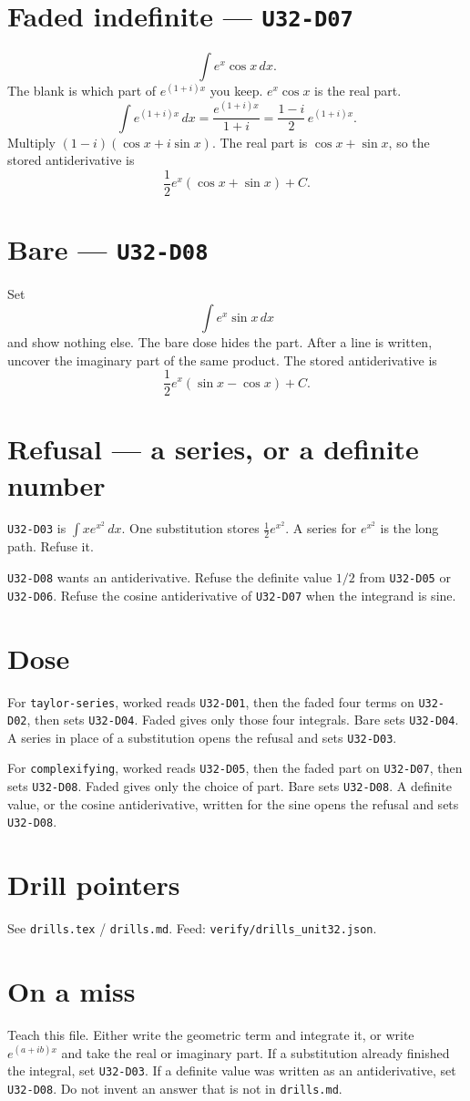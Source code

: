 \section{Faded indefinite --- \texttt{U32-D07}}
\[
\int e^x\cos x\,dx.
\]
The blank is which part of $e^{(1+i)x}$ you keep. $e^x\cos x$ is the real part.
\[
\int e^{(1+i)x}\,dx=\frac{e^{(1+i)x}}{1+i}=\frac{1-i}{2}\,e^{(1+i)x}.
\]
Multiply $(1-i)(\cos x+i\sin x)$. The real part is $\cos x+\sin x$, so the stored antiderivative is
\[
\frac12 e^x(\cos x+\sin x)+C.
\]

\section{Bare --- \texttt{U32-D08}}
Set
\[
\int e^x\sin x\,dx
\]
and show nothing else. The bare dose hides the part. After a line is written, uncover the imaginary part of the same product. The stored antiderivative is
\[
\frac12 e^x(\sin x-\cos x)+C.
\]

\section{Refusal --- a series, or a definite number}
\texttt{U32-D03} is $\int x e^{x^2}\,dx$. One substitution stores $\frac12 e^{x^2}$. A series for $e^{x^2}$ is the long path. Refuse it.

\texttt{U32-D08} wants an antiderivative. Refuse the definite value $1/2$ from \texttt{U32-D05} or \texttt{U32-D06}. Refuse the cosine antiderivative of \texttt{U32-D07} when the integrand is sine.

\section{Dose}
For \texttt{taylor-series}, worked reads \texttt{U32-D01}, then the faded four terms on \texttt{U32-D02}, then sets \texttt{U32-D04}. Faded gives only those four integrals. Bare sets \texttt{U32-D04}. A series in place of a substitution opens the refusal and sets \texttt{U32-D03}.

For \texttt{complexifying}, worked reads \texttt{U32-D05}, then the faded part on \texttt{U32-D07}, then sets \texttt{U32-D08}. Faded gives only the choice of part. Bare sets \texttt{U32-D08}. A definite value, or the cosine antiderivative, written for the sine opens the refusal and sets \texttt{U32-D08}.

\section{Drill pointers}
See \texttt{drills.tex} / \texttt{drills.md}. Feed: \texttt{verify/drills\_unit32.json}.

\section*{On a miss}
Teach this file. Either write the geometric term and integrate it, or write $e^{(a+ib)x}$ and take the real or imaginary part. If a substitution already finished the integral, set \texttt{U32-D03}. If a definite value was written as an antiderivative, set \texttt{U32-D08}. Do not invent an answer that is not in \texttt{drills.md}.

